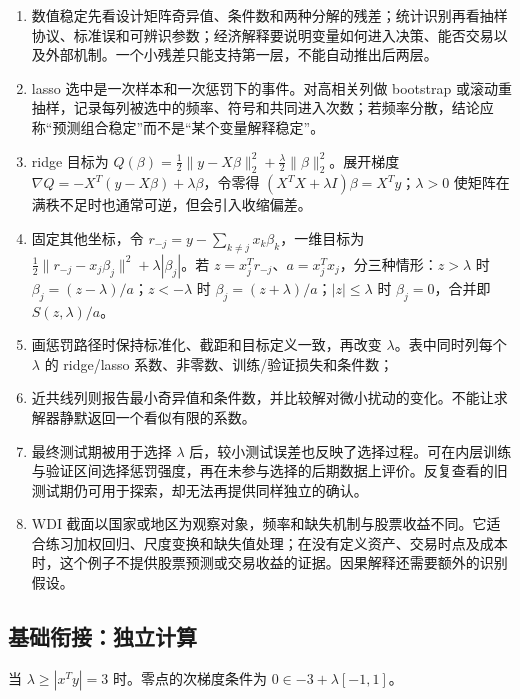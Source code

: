 
\begin{enumerate}[leftmargin=*]
  \item 数值稳定先看设计矩阵奇异值、条件数和两种分解的残差；统计识别再看抽样协议、标准误和可辨识参数；经济解释要说明变量如何进入决策、能否交易以及外部机制。一个小残差只能支持第一层，不能自动推出后两层。
  \item lasso 选中是一次样本和一次惩罚下的事件。对高相关列做 bootstrap 或滚动重抽样，记录每列被选中的频率、符号和共同进入次数；若频率分散，结论应称“预测组合稳定”而不是“某个变量解释稳定”。
  \item ridge 目标为 $Q(\beta)=\frac12\|y-X\beta\|_2^2+\frac\lambda2\|\beta\|_2^2$。展开梯度 $\nabla Q=-X^T(y-X\beta)+\lambda\beta$，令零得 $(X^TX+\lambda I)\beta=X^Ty$；$\lambda>0$ 使矩阵在满秩不足时也通常可逆，但会引入收缩偏差。
  \item 固定其他坐标，令 $r_{-j}=y-\sum_{k\ne j}x_k\beta_k$，一维目标为 $\frac12\|r_{-j}-x_j\beta_j\|^2+\lambda|\beta_j|$。若 $z=x_j^Tr_{-j}$、$a=x_j^Tx_j$，分三种情形：$z>\lambda$ 时 $\beta_j=(z-\lambda)/a$；$z<-\lambda$ 时 $\beta_j=(z+\lambda)/a$；$|z|\le\lambda$ 时 $\beta_j=0$，合并即 $S(z,\lambda)/a$。
  \item 画惩罚路径时保持标准化、截距和目标定义一致，再改变 $\lambda$。表中同时列每个 $\lambda$ 的 ridge/lasso 系数、非零数、训练/验证损失和条件数；
  \item 近共线列则报告最小奇异值和条件数，并比较解对微小扰动的变化。不能让求解器静默返回一个看似有限的系数。
  \item 最终测试期被用于选择 $\lambda$ 后，较小测试误差也反映了选择过程。可在内层训练与验证区间选择惩罚强度，再在未参与选择的后期数据上评价。反复查看的旧测试期仍可用于探索，却无法再提供同样独立的确认。
  \item WDI 截面以国家或地区为观察对象，频率和缺失机制与股票收益不同。它适合练习加权回归、尺度变换和缺失值处理；在没有定义资产、交易时点及成本时，这个例子不提供股票预测或交易收益的证据。因果解释还需要额外的识别假设。
\end{enumerate}

\subsection*{基础衔接：独立计算}
当 $\lambda\geq|x^Ty|=3$ 时。零点的次梯度条件为 $0\in-3+\lambda[-1,1]$。
